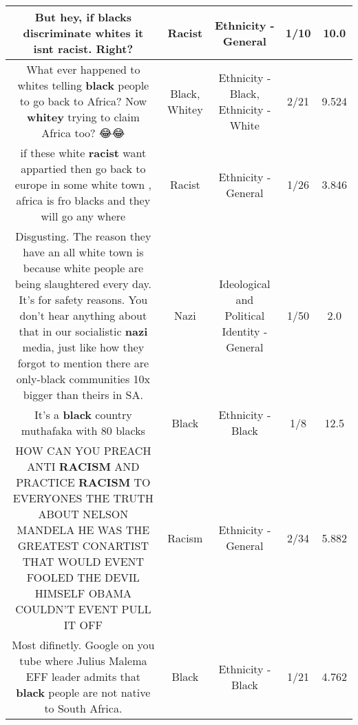\documentclass[11pt]{article}
\newlength\mylength
\begin{document}
\begin{center}
\begin{longtable}{|C{.65\mylength}|C{.30\mylength}|C{.12\mylength}|C{.12\mylength}|C{.12\mylength}|}
  \small But hey, if blacks discriminate whites it isnt \textbf{racist}. Right?\normalsize   & Racist & Ethnicity - General & 1/10 & 10.0 \\  \hline
  \small What ever happened to whites telling \textbf{black} people to go back to Africa? Now \textbf{whitey} trying to claim Africa too? 😂😂\normalsize   & Black, Whitey & Ethnicity - Black, Ethnicity - White & 2/21 & 9.524 \\  \hline
  \small if these white \textbf{racist} want appartied then go back to europe in some white town , africa is fro blacks and they will go any where\normalsize   & Racist & Ethnicity - General & 1/26 & 3.846 \\  \hline
  \small Disgusting. The reason they have an all white town is because white people are being slaughtered every day. It's for safety reasons. You don't hear anything about that in our socialistic \textbf{nazi} media, just like how they forgot to mention there are only-black communities 10x bigger than theirs in SA.\normalsize   & Nazi &  Ideological and Political Identity - General & 1/50 & 2.0 \\  \hline
  \small It's a \textbf{black} country muthafaka with 80 blacks\normalsize   & Black & Ethnicity - Black & 1/8 & 12.5 \\  \hline
  \small HOW CAN YOU PREACH ANTI \textbf{RACISM} AND PRACTICE  \textbf{RACISM} TO EVERYONES  THE TRUTH ABOUT NELSON MANDELA  HE WAS THE GREATEST CONARTIST THAT WOULD EVENT FOOLED THE DEVIL HIMSELF OBAMA COULDN'T EVENT PULL  IT OFF\normalsize   & Racism & Ethnicity - General & 2/34 & 5.882 \\  \hline
  \small Most difinetly. Google on you tube where Julius Malema EFF leader admits that \textbf{black} people are not native to South Africa.\normalsize   & Black & Ethnicity - Black & 1/21 & 4.762 \\  \hline

\end{longtable}
\end{center}
\end{document}
